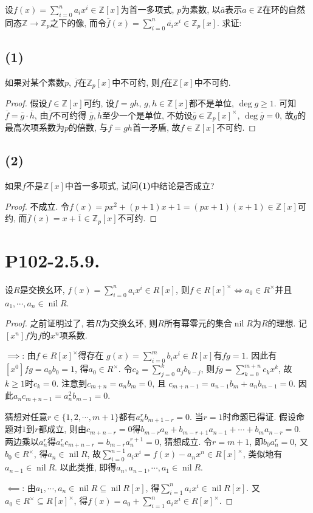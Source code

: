 \documentclass[12pt, a4paper, fontset=windows]{ctexart}
\newcommand{\Z}{\mathbb{Z}}
\newcommand{\cl}[1]{\overline{#1}} %
\newcommand{\nil}{\operatorname{nil}}
\newcommand{\unit}[1]{{#1}^\times}
\begin{document}
设$f(x)=\sum^n_{i=0}a_ix^i\in\Z[x]$为首一多项式, $p$为素数, 
以$\cl{a}$表示$a\in\Z$在环的自然同态$\Z\to\Z_p$之下的像, 
而令$\cl{f}(x)=\sum^n_{i=0}\cl{a_i}x^i\in\Z_p[x]$. 求证: 

\subsection*{(1)}

如果对某个素数$p$, $\cl{f}$在$\Z_p[x]$中不可约, 
则$f$在$\Z[x]$中不可约. 

\begin{proof}
假设$f\in\Z[x]$可约, 设$f=gh$, $g,h\in\Z[x]$都不是单位, $\deg g\ge 1$. 
可知$\cl{f}=\cl{g}\cdot\cl{h}$, 由$\cl{f}$不可约得
$\cl{g},\cl{h}$至少一个是单位, 不妨设$\cl{g}\in\unit{\Z_p[x]}$, 
$\deg\cl{g}=0$, 故$g$的最高次项系数为$p$的倍数, 
与$f=gh$首一矛盾, 故$f\in\Z[x]$不可约. 
\end{proof}

\subsection*{(2)}

如果$f$不是$\Z[x]$中首一多项式, 试问{\bf (1)}中结论是否成立? 

\begin{proof}
不成立. 令$f(x)=px^2+(p+1)x+1=(px+1)(x+1)\in\Z[x]$可约, 
而$\cl{f}(x)=x+\cl{1}\in\Z_p[x]$不可约. 
\end{proof}

\section*{P102-2.5.9.}

设$R$是交换幺环, $f(x)=\sum^n_{i=0}a_ix^i\in R[x]$, 
则$f\in\unit{R[x]}\iff a_0\in R^\times$并且$a_1,\cdots,a_n\in\nil R$. 

\begin{proof}
之前证明过了, 若$R$为交换幺环, 
则$R$所有幂零元的集合$\nil R$为$R$的理想. 
记$[x^n]f$为$f$的$x^n$项系数. 

$\implies$: 由$f\in\unit{R[x]}$得存在
$g(x)=\sum^m_{i=0}b_ix^i\in R[x]$有$fg=1$. 
因此有$[x^0]fg=a_0b_0=1$, 得$a_0\in\unit{R}$. 
令$c_k=\sum^k_{j=0}a_jb_{k-j}$, 则$fg=\sum^{m+n}_{k=0}c_kx^k$, 
故$k\ge 1$时$c_k=0$. 注意到$c_{m+n}=a_nb_m=0$, 且
$c_{m+n-1}=a_{n-1}b_m+a_nb_{m-1}=0$. 
因此$a_nc_{m+n-1}=a_n^2b_{m-1}=0$. 

猜想对任意$r\in\{1,2,\cdots,m+1\}$都有$a_n^rb_{m+1-r}=0$. 
当$r=1$时命题已得证. 假设命题对$1$到$r$都成立, 
则由$c_{m+n-r}=0$得$b_{m-r}a_n+b_{m-r+1}a_{n-1}+\cdots+b_ma_{n-r}=0$. 
两边乘以$a_n^r$得$a_n^rc_{m+n-r}=b_{m-r}a_n^{r+1}=0$, 猜想成立. 
令$r=m+1$, 即$b_0a_n^r=0$, 又$b_0\in\unit{R}$, 得$a_n\in\nil R$, 
故$\sum^{n-1}_{i=0}a_ix^i=f(x)-a_nx^n\in\unit{R[x]}$, 
类似地有$a_{n-1}\in\nil R$. 以此类推, 
即得$a_n,a_{n-1},\cdots,a_1\in\nil R$. 

$\impliedby$: 由$a_1,\cdots,a_n\in\nil R\subseteq\nil R[x]$, 
得$\sum^n_{i=1}a_ix^i\in\nil R[x]$. 又$a_0\in\unit{R}\subseteq\unit{R[x]}$, 
得$f(x)=a_0+\sum^n_{i=1}a_ix^i\in\unit{R[x]}$. 
\end{proof}
\end{document}

